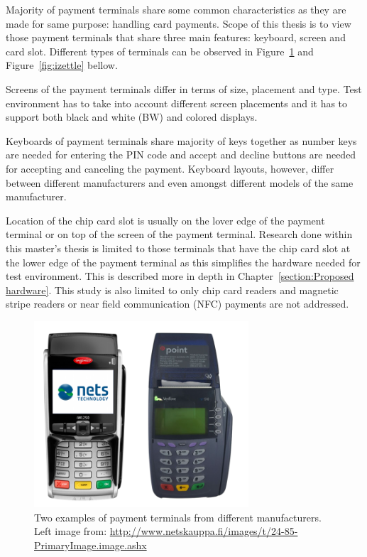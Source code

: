 Majority of payment terminals share some common characteristics as they are made for same purpose: handling card payments. Scope of this thesis is to view those payment terminals that share three main features: keyboard, screen and card slot. Different types of terminals can be observed in Figure~\ref{fig:terminals} and Figure~\ref{fig:izettle} bellow.

Screens of the payment terminals differ in terms of size, placement and type. Test environment has to take into account different screen placements and it has to support both black and white (BW) and colored displays.

Keyboards of payment terminals share majority of keys together as number keys are needed for entering the PIN code and accept and decline buttons are needed for accepting and canceling the payment. Keyboard layouts, however, differ between different manufacturers and even amongst different models of the same manufacturer.

Location of the chip card slot is usually on the lover edge of the payment terminal or on top of the screen of the payment terminal. Research done within this master's thesis is limited to those terminals that have the chip card slot at the lower edge of the payment terminal as this simplifies the hardware needed for test environment. This is described more in depth in Chapter~\ref{section:Proposed hardware}. This study is also limited to only chip card readers and magnetic stripe readers or near field communication (NFC) payments are not addressed.

\begin{figure}[ht]
  \begin{center}
    \includegraphics[width=8cm]{images/terminal1.png}
    \caption{Two examples of payment terminals from different manufacturers. Left image from: \url{http://www.netskauppa.fi/images/t/24-85-PrimaryImage.image.ashx}}
    \label{fig:terminals}
  \end{center}
\end{figure}

